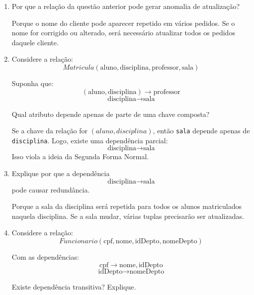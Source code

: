 \documentclass[12pt,a4paper]{article}
\begin{document}
\begin{enumerate}[resume,label=\textbf{Q\arabic*.}]
\begin{resposta}
A dependência problemática é:
\[
\text{idCliente} \rightarrow \text{nomeCliente}
\]

Se o nome do cliente fica armazenado em todos os pedidos, haverá redundância.
\end{resposta}

\item Por que a relação da questão anterior pode gerar anomalia de atualização?

\begin{resposta}
Porque o nome do cliente pode aparecer repetido em vários pedidos. Se o nome for corrigido ou alterado, será necessário atualizar todos os pedidos daquele cliente.
\end{resposta}

\item Considere a relação:
\[
Matricula(\text{aluno}, \text{disciplina}, \text{professor}, \text{sala})
\]

Suponha que:
\[
(\text{aluno}, \text{disciplina}) \rightarrow \text{professor}
\]
\[
\text{disciplina} \rightarrow \text{sala}
\]

Qual atributo depende apenas de parte de uma chave composta?

\begin{resposta}
Se a chave da relação for $(aluno, disciplina)$, então \texttt{sala} depende apenas de \texttt{disciplina}. Logo, existe uma dependência parcial:
\[
\text{disciplina} \rightarrow \text{sala}
\]
Isso viola a ideia da Segunda Forma Normal.
\end{resposta}

\item Explique por que a dependência
\[
\text{disciplina} \rightarrow \text{sala}
\]
pode causar redundância.

\begin{resposta}
Porque a sala da disciplina será repetida para todos os alunos matriculados naquela disciplina. Se a sala mudar, várias tuplas precisarão ser atualizadas.
\end{resposta}

\item Considere a relação:
\[
Funcionario(\text{cpf}, \text{nome}, \text{idDepto}, \text{nomeDepto})
\]

Com as dependências:
\[
\text{cpf} \rightarrow \text{nome}, \text{idDepto}
\]
\[
\text{idDepto} \rightarrow \text{nomeDepto}
\]

Existe dependência transitiva? Explique.


\end{enumerate}
\end{document}
